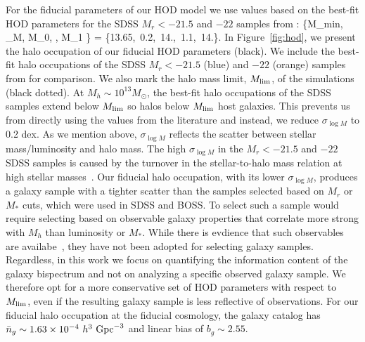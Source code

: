 For the fiducial parameters of our HOD model we use values based on the 
best-fit HOD parameters for the SDSS $M_r < -21.5$  and $-22$ samples from \cite{zheng2007}: 
\beq \label{eq:hod_fid}
\{M_{\rm min}, \sigma_{\log M}, \log M_0, \alpha, \log M_1 \} = \{13.65,~0.2,~14.,~1.1,~14.\}.
\eeq
In Figure~\ref{fig:hod}, we present the halo occupation of our fiducial 
HOD parameters (black). We include the best-fit halo occupations of 
the SDSS $M_r < -21.5$ (blue)  and $-22$ (orange) samples from \cite{zheng2007}
for comparison. We also mark the halo mass limit, $M_{\rm lim}$, of the \quij 
simulations (black dotted). At $M_h \sim 10^{13} M_\odot$, the best-fit halo 
occupations of the SDSS samples extend below $M_{\rm lim}$ so halos below $M_{\rm lim}$ host galaxies. This prevents us from 
directly using the values from the literature and instead, we reduce 
$\sigma_{\log M}$ to 0.2 dex.
As we mention above, $\sigma_{\log M}$ reflects the scatter between stellar 
mass/luminosity and halo mass. The high $\sigma_{\log M}$ in the $M_r < -21.5$ 
and $-22$ SDSS samples is caused by the turnover in the stellar-to-halo mass relation at high stellar 
masses~\citep{mandelbaum2006a, conroy2007, more2011, leauthaud2012, tinker2013,
zu2015, hahn2019a}. Our fiducial halo occupation, with its lower $\sigma_{\log M}$, 
produces a galaxy sample with a tighter scatter than the samples selected based 
on $M_r$ or $M_*$ cuts, which were used in SDSS and BOSS. To select such a sample
would require selecting based on observable galaxy properties that correlate 
more strong with $M_h$ than luminosity or $M_*$. While there is evdience
that such observables are availabe~\citep[\eg~$L_{\rm sat}$; ][]{alpaslan2019},
they have not been adopted for selecting galaxy samples. Regardless, in this work
we focus on quantifying the information content of the galaxy bispectrum 
and not on analyzing a specific observed galaxy sample. We therefore opt for 
a more conservative set of HOD parameters with respect to $M_{\rm lim}$, even
if the resulting galaxy sample is less reflective of observations. For our
fiducial halo occupation at the fiducial cosmology, the galaxy catalog has 
$\bar{n}_g \sim 1.63\times 10^{-4}~h^3~{\rm Gpc}^{-3}$ and linear bias of 
$b_g \sim 2.55$.

